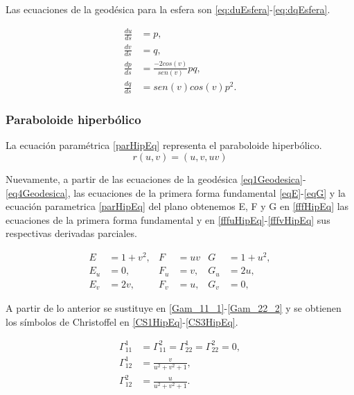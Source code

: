 \documentclass{endm}
\begin{document}
Las ecuaciones de la geod\'esica para la esfera son \ref{eq:duEsfera}-\ref{eq:dqEsfera}.

\begin{align}
\frac{du}{ds}&=p,\label{eq:duEsfera} \\
\frac{dv}{ds}&=q,\label{eq:dvEsfera}     \\
\frac{dp}{ds}&=\frac{-2cos(v)}{sen(v)} pq, \label{eq:dpEsfera}\\ 
\frac{dq}{ds}&= sen(v)cos(v) p^2. \label{eq:dqEsfera}
\end{align}

\subsubsection{Paraboloide hiperb\'olico}

La ecuaci\'on param\'etrica \ref{parHipEq} representa el paraboloide hiperb\'olico.
\begin{equation} \label{parHipEq}
r(u,v) = (u,v,uv)
\end{equation}

Nuevamente, a partir de las ecuaciones de la geod\'esica \ref{eq1Geodesica}-\ref{eq4Geodesica}, las ecuaciones de la primera forma fundamental \ref{eqE}-\ref{eqG} y la ecuaci\'on parametrica \ref{parHipEq} del plano obtenemos E, F y G en \ref{fffHipEq} las ecuaciones de la primera forma fundamental y en \ref{fffuHipEq}-\ref{fffvHipEq} sus respectivas derivadas parciales.

\begin{align} \label{fffHipEq}
E&=1+v^2,   & F &=uv    & G&=1+u^2, \label{fffHipEq} \\
E_u&=0,     & F_u&=v,   & G_u&=2u, \label{fffuHipEq}\\
E_v&=2v,    & F_v&=u,   & G_v&=0, \label{fffvHipEq}
\end{align}

A partir de lo anterior se sustituye en \ref{Gam_11_1}-\ref{Gam_22_2} y se obtienen los s\'imbolos de Christoffel en \ref{CS1HipEq}-\ref{CS3HipEq}.

\begin{align}
\Gamma_{11}^1&=\Gamma_{11}^2=\Gamma_{22}^1=\Gamma_{22}^2=0, \label{CS1HipEq} \\
\Gamma_{12}^1&=\frac{v}{u^2+v^2+1},  \label{CS2HipEq}   \\
\Gamma_{12}^2&=\frac{u}{u^2+v^2+1}.  \label{CS3HipEq}
\end{align}
\end{document}
